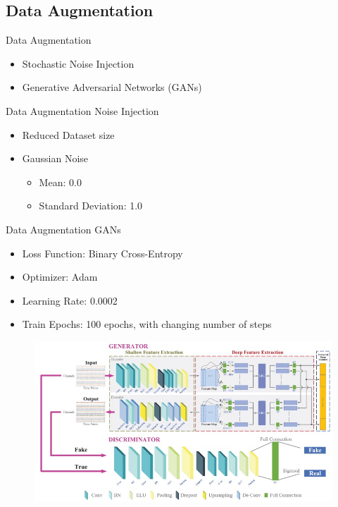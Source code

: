 \subsection*{Data Augmentation}
\begin{frame}{Data Augmentation}
    \begin{itemize}
        \item Stochastic Noise Injection
        \item Generative Adversarial Networks (GANs)
    \end{itemize}
\end{frame}
\begin{frame}{Data Augmentation \textemdash{} Noise Injection}
    \begin{itemize}
        \item Reduced Dataset size
        \item Gaussian Noise
        \begin{itemize}
            \item Mean: 0.0
            \item Standard Deviation: 1.0
        \end{itemize}
    \end{itemize}
\end{frame}
\begin{frame}{Data Augmentation \textemdash{} GANs}
    \begin{minipage}[c]{.6\textwidth}
        \begin{itemize}
            \item Loss Function: Binary Cross-Entropy
            \item Optimizer: Adam
            \item Learning Rate: 0.0002
            \item Train Epochs: 100 epochs, with changing number of steps
        \end{itemize}
    \end{minipage}
    \begin{minipage}[c]{.39\textwidth}
        \begin{figure}[!htbp]
            \centering
            \includegraphics[width=\textwidth]{figures/Methodology/GAN}
        \end{figure}
    \end{minipage}
\end{frame}

